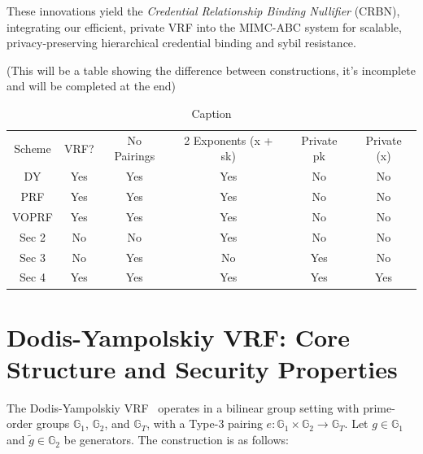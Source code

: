 These innovations yield the \emph{Credential Relationship Binding Nullifier} (CRBN), integrating our efficient, private VRF into the MIMC-ABC system for scalable, privacy-preserving hierarchical credential binding and sybil resistance.

(This will be a table showing the difference between constructions, it's incomplete and will be completed at the end)
\begin{table}
    \centering
    \begin{tabular}{cccccc}
       Scheme  & VRF?     & No Pairings  & 2 Exponents (x + sk)  & Private pk & Private (x) \\
       DY      & Yes     & Yes           & Yes                   & No         & No \\
       PRF      & Yes     & Yes           & Yes                   & No         & No \\
       VOPRF      & Yes     & Yes           & Yes                   & No         & No \\
       Sec 2   & No     & No            & Yes                   & No         & No \\
       Sec 3   & No     & Yes           & No                    & Yes        & No \\
       Sec 4   & Yes     & Yes           & Yes                   & Yes        & Yes\\
    \end{tabular}
    \caption{Caption}
    \label{tab:my_label}
\end{table}












\section{Dodis-Yampolskiy VRF: Core Structure and Security Properties}

The Dodis-Yampolskiy VRF~\cite{hutchison_verifiable_2005} operates in a bilinear group setting with prime-order groups $\mathbb{G}_1$, $\mathbb{G}_2$, and $\mathbb{G}_T$, with a Type-3 pairing $e: \mathbb{G}_1 \times \mathbb{G}_2 \rightarrow \mathbb{G}_T$. Let $g \in \mathbb{G}_1$ and $\tilde{g} \in \mathbb{G}_2$ be generators. The construction is as follows:

